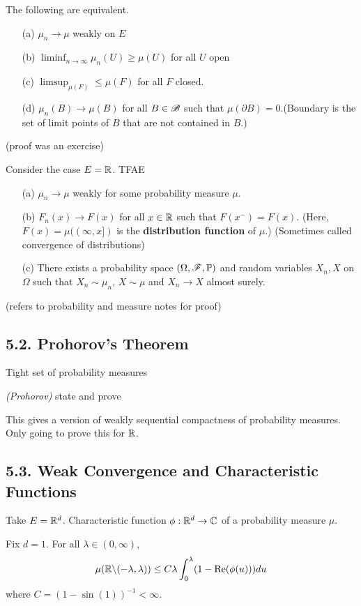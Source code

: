 \documentclass[10pt,a4paper]{report}
\begin{document}
 The following are equivalent.
\begin{itemize}
\item[(a)] $\mu_n \rightarrow \mu$ weakly on $E$
\item[(b)] $\liminf_{n\rightarrow \infty} \mu_n(U) \geq \mu(U)$ for all $U$ open
\item[(c)] $\limsup_{\mu(F)} \leq \mu(F)$ for all $F$ closed.
\item[(d)] $\mu_n(B) \rightarrow \mu(B)$ for all $B \in \mathscr{B}$ such that $\mu(\partial B)=0$.(Boundary is the set of limit points of $B$ that are not contained in $B$.)
\end{itemize}
(proof was an exercise)
\s

 Consider the case $E =\mathbb{R}$. TFAE
\begin{itemize}
\item[(a)] $\mu_n \rightarrow \mu$ weakly for some probability measure $\mu$.
\item[(b)] $F_n(x) \rightarrow F(x)$ for all $x\in \mathbb{R}$ such that $F(x^-) = F(x)$. (Here, $F(x)  = \mu((\infty,x])$ is the \textbf{distribution function} of $\mu$.) (Sometimes called convergence of distributions)
\item[(c)] There exists a probability space $(\Omega,\mathscr{F}, \mathbb{P})$ and random variables $X_n, X$ on $\Omega$ such that $X_n \sim \mu_n$, $X\sim \mu$ and $X_n \rightarrow X$ almost surely.
\end{itemize}
(refers to probability and measure notes for proof)
\s

\subsection*{5.2. Prohorov's Theorem}

Tight set of probability measures

 \emph{(Prohorov)} state and prove
\s

This gives a version of weakly sequential compactness of probability measures. Only going to prove this for $\mathbb{R}$.

\subsection*{5.3. Weak Convergence and Characteristic Functions}

Take $E = \mathbb{R}^d$.  Characteristic function $\phi : \mathbb{R}^d \rightarrow \mathbb{C}$ of a probability measure $\mu$.

 Fix $d=1$. For all $\lambda \in (0,\infty)$,
\begin{align*}
\mu(\mathbb{R} \backslash (-\lambda, \lambda)) \leq C\lambda \int_{0}^{\lambda} (1- \text{Re}(\phi(u))) du
\end{align*}
where $C = (1- \sin(1))^{-1} < \infty$.
\s
\end{document}
